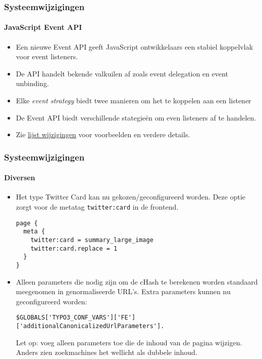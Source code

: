 
\begin{frame}[fragile]
	\frametitle{Systeemwijzigingen}
	\framesubtitle{JavaScript Event API}

	\begin{itemize}
		\item Een nieuwe Event API geeft JavaScript ontwikkelaars een stabiel koppelvlak voor event listeners.
		\item De API handelt bekende valkuilen af zoals event delegation en event unbinding.
		\item Elke \textit{event strategy} biedt twee manieren om het te koppelen aan een listener
		\item De Event API biedt verschillende stategieën om even listeners af te handelen.
		\item Zie
			\href{https://docs.typo3.org/c/typo3/cms-core/master/en-us/Changelog/10.3/Feature-90471-JavaScriptEventAPI.html}{lijst wijzigingen}
			voor voorbeelden en verdere details.
	\end{itemize}

\end{frame}


\begin{frame}[fragile]
	\frametitle{Systeemwijzigingen}
	\framesubtitle{Diversen}

	\lstset{basicstyle=\tiny\ttfamily}

	\begin{itemize}

		\item Het type Twitter Card kan nu gekozen/geconfigureerd worden.
			Deze optie zorgt voor de metatag \texttt{twitter:card} in de frontend.
\begin{lstlisting}
page {
  meta {
    twitter:card = summary_large_image
    twitter:card.replace = 1
  }
}
\end{lstlisting}

		\item Alleen parameters die nodig zijn om de cHash te berekenen worden standaard meegenomen in genormaliseerde URL's.
			Extra parameters kunnen nu geconfigureerd worden:
\begin{lstlisting}
$GLOBALS['TYPO3_CONF_VARS']['FE']['additionalCanonicalizedUrlParameters'].
\end{lstlisting}

		\smaller
			Let op: voeg alleen parameters toe die de inhoud van de pagina wijzigen. Anders zien zoekmachines het wellicht als dubbele inhoud.
		\normalsize

	\end{itemize}

\end{frame}

